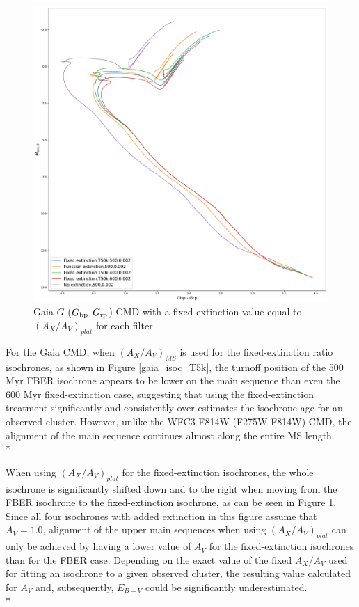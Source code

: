 \documentclass[12pt, a4paper]{report}
\begin{document}
\begin{figure}[h!]
\begin{center}
\includegraphics[width=1.0\textwidth]{../basti_isochrones_10_13Gyr/Extinction_T50k_FeH0fix_func_G_GbpmGrp_500_400_600_Myr_FeH_0p002_ref_noext_Av_1p0.pdf}
\caption{Gaia $G$-($G_{\textnormal{bp}}$-$G_{\textnormal{rp}}$) CMD with a fixed extinction value equal to $(A_{X}/A_{V})_{plat}$ for each filter}
\label{gaia_isoc_T50k}
\end{center}
\end{figure}

For the Gaia CMD, when $(A_{X}/A_{V})_{MS}$ is used for the fixed-extinction ratio isochrones, as shown in Figure \ref{gaia_isoc_T5k}, the turnoff position of the 500 Myr FBER isochrone appears to be lower on the main sequence than even the 600 Myr fixed-extinction case, suggesting that using the fixed-extinction treatment significantly and consistently over-estimates the isochrone age for an observed cluster. However, unlike the WFC3 F814W-(F275W-F814W) CMD, the alignment of the main sequence continues almost along the  entire MS length. \\*

When using $(A_{X}/A_{V})_{plat}$ for the fixed-extinction isochrones, the whole isochrone is significantly shifted down and to the right when moving from the FBER isochrone to the fixed-extinction isochrone, as can be seen in Figure \ref{gaia_isoc_T50k}. Since all four isochrones with added extinction in this figure assume that $A_{V} = 1.0$, alignment of the upper main sequences when using $(A_{X}/A_{V})_{plat}$ can only be achieved by having a lower value of $A_{V}$ for the fixed-extinction isochrones than for the FBER case. Depending on the exact value of the fixed $A_{X}/A_{V}$ used for fitting an isochrone to a given observed cluster, the resulting value calculated for $A_{V}$ and, subsequently, $E_{B-V}$ could be significantly underestimated. \\*
\end{document}
